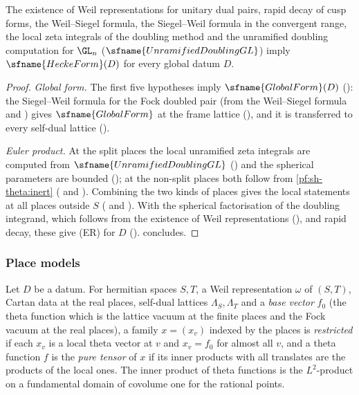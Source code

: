 \begin{theorem}\label{pf:sh-theta:heckeform}
The existence of Weil representations for unitary dual pairs, rapid decay of cusp forms, the Weil--Siegel formula, the
Siegel--Weil formula in the convergent range, the local zeta integrals of the doubling method and the unramified doubling
computation for $\GL_n$ ($\sfname{UnramifiedDoublingGL}$) imply $\sfname{HeckeForm}(D)$ for every global datum $D$.
\end{theorem}

\begin{proof}
\emph{Global form.} The first five hypotheses imply $\sfname{GlobalForm}(D)$
(): the Siegel--Weil formula for the Fock doubled pair (from the Weil--Siegel
formula and \cite{Ichino2004}) gives $\sfname{GlobalForm}$ at the frame lattice
(), and it is transferred to every self-dual lattice
().

\emph{Euler product.} At the split places the local unramified zeta integrals are computed from $\sfname{UnramifiedDoublingGL}$
() and the spherical parameters are bounded
(); at the non-split places both follow from
\cref{pf:sh-theta:inert} ( and ).
Combining the two kinds of places gives the local statements at all places outside $S$
( and ). With
the spherical factorisation of the doubling integrand, which follows from the existence of Weil representations
(), and rapid decay, these give (ER) for $D$
().  concludes.
\end{proof}

\subsubsection{Place models}

Let $D$ be a datum. For hermitian spaces $S,T$, a Weil representation $\omega$ of $(S,T)$, Cartan data at the real places,
self-dual lattices $\Lambda_S,\Lambda_T$ and a \emph{base vector} $f_0$ (the theta function which is the lattice vacuum at the
finite places and the Fock vacuum at the real places), a family $x=(x_v)$ indexed by the places is \emph{restricted} if each $x_v$
is a local theta vector at $v$ and $x_v=f_0$ for almost all $v$, and a theta function $f$ is the \emph{pure tensor} of $x$ if its
inner products with all translates are the products of the local ones. The inner product of theta functions is the $L^2$-product
on a fundamental domain of covolume one for the rational points.

